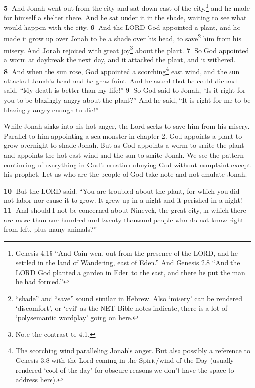\documentclass[
]{article}
\newcommand{\RL}[1]{\beginR #1\endR}
\begin{document}
\textbf{5~}And Jonah went out from the city and sat down east of the
city,\footnote{Genesis 4.16 ``And Cain went out from the presence of the
  LORD, and he settled in the land of Wandering, east of Eden.'' And
  Genesis 2.8 ``And the LORD God planted a garden in Eden to the east,
  and there he put the man he had formed.''} and he made for himself a
shelter there. And he sat under it in the shade, waiting to see what
would happen with the city. \textbf{6~}And the LORD God appointed a
plant, and he made it grow up over Jonah to be a shade over his head, to
save\footnote{``shade'' and ``save'' sound similar in Hebrew. Also
  `misery' can be rendered `discomfort', or `evil' as the NET Bible
  notes indicate, there is a lot of `polysemantic wordplay' going on
  here.} him from his misery. And Jonah rejoiced with great
joy\footnote{Note the contrast to 4.1.} about the plant. \textbf{7~}So
God appointed a worm at daybreak the next day, and it attacked the
plant, and it withered. \textbf{8~}And when the sun rose, God appointed
a scorching\footnote{The scorching wind paralleling Jonah's anger. But
  also possibly a reference to Genesis 3.8 with the Lord coming in the
  Spirit/wind of the Day (usually rendered `cool of the day' for obscure
  reasons we don't have the space to address here).} east wind, and the
sun attacked Jonah\RL{'}s head and he grew faint. And he asked that he
could die and said, \RL{``}My death is better than my life!''
\textbf{9~}So God said to Jonah, \RL{``}Is it right for you to be
blazingly angry about the plant?'' And he said, \RL{``}It is right for
me to be blazingly angry enough to die!''

While Jonah sinks into his hot anger, the Lord seeks to save him from
his misery. Parallel to him appointing a sea monster in chapter 2, God
appoints a plant to grow overnight to shade Jonah. But as God appoints a
worm to smite the plant and appoints the hot east wind and the sun to
smite Jonah. We see the pattern continuing of everything in God's
creation obeying God without complaint except his prophet. Let us who
are the people of God take note and not emulate Jonah.

\textbf{10~}But the LORD said, \RL{``}You are troubled about the plant,
for which you did not labor nor cause it to grow. It grew up in a night
and it perished in a night! \textbf{11~}And should I not be concerned
about Nineveh, the great city, in which there are more than one hundred
and twenty thousand people who do not know right from left, plus many
animals?''
\end{document}
